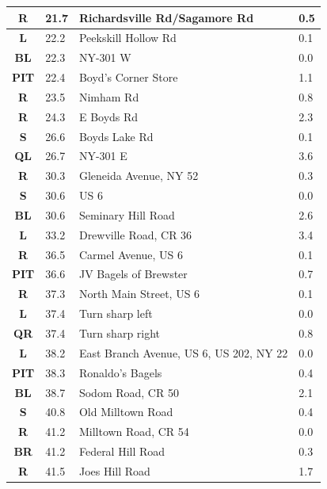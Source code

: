 \documentclass[11pt]{article}
\begin{document}
\begin{center}
\begin{supertabular}{|c|p{0.30in}|p{2.25in}|l|}
 \textbf{R} &  21.7 & Richardsville Rd/\hspace{0pt}Sagamore Rd &   0.5 \\ \hline
 \textbf{L} &  22.2 & Peekskill Hollow Rd &   0.1 \\ \hline
 \textbf{BL} &  22.3 & NY-301 W &   0.0 \\ \hline
{} \textbf{PIT} &  22.4 & Boyd's Corner Store &   1.1 \\ \hline
{} \textbf{R} &  23.5 & Nimham Rd &   0.8 \\ \hline
{} \textbf{R} &  24.3 & E Boyds Rd &   2.3 \\ \hline
 \textbf{S} &  26.6 & Boyds Lake Rd &   0.1 \\ \hline
 \textbf{QL} &  26.7 & NY-301 E &   3.6 \\ \hline
{} \textbf{R} &  30.3 & Gleneida Avenue, NY 52 &   0.3 \\ \hline
 \textbf{S} &  30.6 & US 6 &   0.0 \\ \hline
 \textbf{BL} &  30.6 & Seminary Hill Road &   2.6 \\ \hline
 \textbf{L} &  33.2 & Drewville Road, CR 36 &   3.4 \\ \hline
{} \textbf{R} &  36.5 & Carmel Avenue, US 6 &   0.1 \\ \hline
{} \textbf{PIT} &  36.6 & JV Bagels of Brewster &   0.7 \\ \hline
{} \textbf{R} &  37.3 & North Main Street, US 6 &   0.1 \\ \hline
 \textbf{L} &  37.4 & Turn sharp left &   0.0 \\ \hline
{} \textbf{QR} &  37.4 & Turn sharp right &   0.8 \\ \hline
 \textbf{L} &  38.2 & East Branch Avenue, US 6, US 202, NY 22 &   0.0 \\ \hline
{} \textbf{PIT} &  38.3 & Ronaldo's Bagels &   0.4 \\ \hline
 \textbf{BL} &  38.7 & Sodom Road, CR 50 &   2.1 \\ \hline
 \textbf{S} &  40.8 & Old Milltown Road &   0.4 \\ \hline
{} \textbf{R} &  41.2 & Milltown Road, CR 54 &   0.0 \\ \hline
{} \textbf{BR} &  41.2 & Federal Hill Road &   0.3 \\ \hline
{} \textbf{R} &  41.5 & Joes Hill Road &   1.7 \\ \hline

\end{supertabular}
\end{center}
\end{document}
